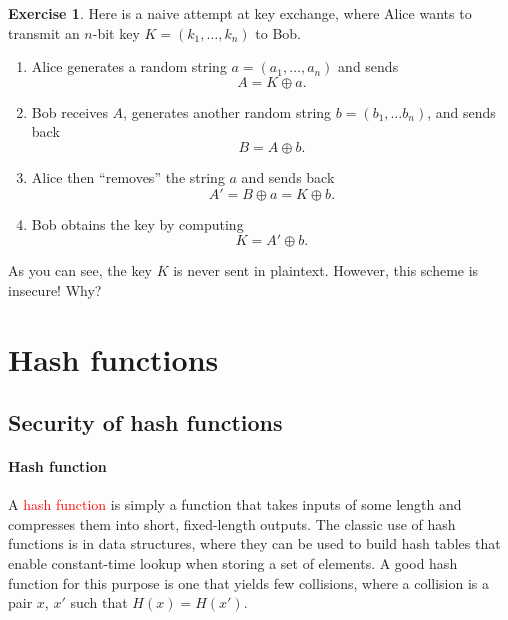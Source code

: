 \documentclass[a4paper, 11pt, openany]{book}
\numberwithin{equation}{section}
\theoremstyle{plain}
\theoremstyle{definition}
\newtheorem{exercise}   {Exercise}  [section]
\newcommand{\Important}[1]{\textcolor{red}{#1}}
\begin{document}
\begin{exercise}
Here is a naive attempt at key exchange, where Alice wants to transmit an $n$-bit key $K = (k_1, \dots, k_n)$ to Bob.
\begin{enumerate}
    \item Alice generates a random string $a = (a_1, \dots, a_n)$ and sends
    \[
        A = K \oplus a.
    \]
    
    \item Bob receives $A$, generates another random string $b = (b_1, \dots b_n)$, and sends back
    \[
        B = A \oplus b.
    \]
    
    \item Alice then ``removes'' the string $a$ and sends back
    \[
        A' = B \oplus a = K \oplus b.
    \]
    
    \item Bob obtains the key by computing
    \[
        K = A' \oplus b.
    \]
\end{enumerate}
As you can see, the key $K$ is never sent in plaintext. However, this scheme is insecure! Why?
\end{exercise}






















\section{Hash functions}
\label{sec:17}

\subsection{Security of hash functions}


\paragraph{Hash function}

A \Important{hash function} is simply a function that takes inputs of some length and compresses them into short, fixed-length outputs. The classic use of hash functions is in data structures, where they can be used to build hash tables that enable constant-time lookup when storing a set of elements. A good hash function for this purpose is one that yields few collisions, where a collision is a pair $x$, $x'$ such that $H(x) = H(x')$.
\end{document}
